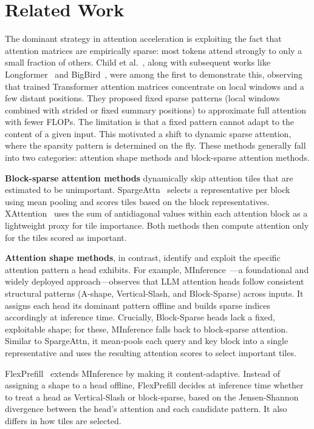 \section{Related Work}

The dominant strategy in attention acceleration is exploiting the fact that attention matrices are empirically sparse: most tokens attend strongly to only a small fraction of others.
Child et al.~\cite{child2019generating}, along with subsequent works like Longformer~\cite{Beltagy2020Longformer} and BigBird~\cite{zaheer2020bigbird}, were among the first to demonstrate this, observing that trained Transformer attention matrices concentrate on local windows and a few distant positions.
They proposed fixed sparse patterns (local windows combined with strided or fixed summary positions) to approximate full attention with fewer FLOPs.
The limitation is that a fixed pattern cannot adapt to the content of a given input. This motivated a shift to dynamic sparse attention, where the sparsity pattern is determined on the fly. These methods generally fall into two categories: attention shape methods and block-sparse attention methods.

\textbf{Block-sparse attention methods} dynamically skip attention tiles that are estimated to be unimportant. SpargeAttn~\cite{zhang2025spargeattn} selects a representative per block using mean pooling and scores tiles based on the block representatives. XAttention~\cite{xu2025xattention} uses the sum of antidiagonal values within each attention block as a lightweight proxy for tile importance. Both methods then compute attention only for the tiles scored as important.

\textbf{Attention shape methods}, in contrast, identify and exploit the specific attention pattern a head exhibits. For example, MInference~\cite{jiang2024minference}---a foundational and widely deployed approach---observes that LLM attention heads follow consistent structural patterns (A-shape, Vertical-Slash, and Block-Sparse) across inputs. It assigns each head its dominant pattern offline and builds sparse indices accordingly at inference time. Crucially, Block-Sparse heads lack a fixed, exploitable shape; for these, MInference falls back to block-sparse attention. Similar to SpargeAttn, it mean-pools each query and key block into a single representative and uses the resulting attention scores to select important tiles.

FlexPrefill~\cite{lai2025flexprefill} extends MInference by making it content-adaptive. Instead of assigning a shape to a head offline, FlexPrefill decides at inference time whether to treat a head as Vertical-Slash or block-sparse, based on the Jensen-Shannon divergence between the head's attention and each candidate pattern. It also differs in how tiles are selected.



